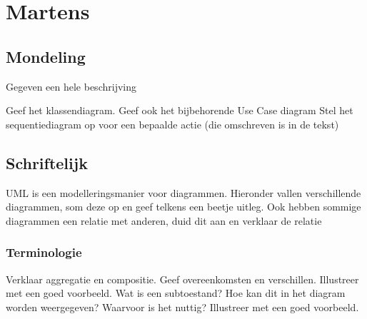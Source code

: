 \section{Martens}

\subsection{Mondeling}

Gegeven een hele beschrijving

\be
\itf Geef het klassendiagram.
\itf Geef ook het bijbehorende Use Case diagram
\itf Stel het sequentiediagram op voor een bepaalde actie (die omschreven is in de tekst)
\ee



\subsection{Schriftelijk}

UML is een modelleringsmanier voor diagrammen. Hieronder vallen verschillende diagrammen, som deze op en geef telkens een beetje uitleg. Ook hebben sommige diagrammen een relatie met anderen, duid dit aan en verklaar de relatie

\subsubsection{Terminologie}

\be
\itf Verklaar aggregatie en compositie. Geef overeenkomsten en verschillen. Illustreer met een goed voorbeeld.
\itf Wat is een subtoestand? Hoe kan dit in het diagram worden weergegeven? Waarvoor is het nuttig? Illustreer met een goed voorbeeld.

\ee

